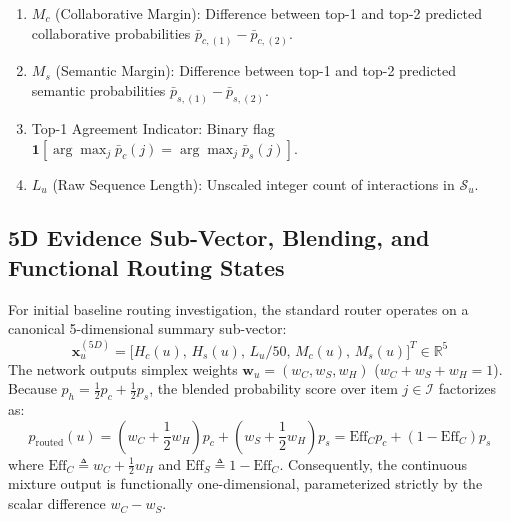 \begin{enumerate}[leftmargin=*]
    \item $M_c$ (Collaborative Margin): Difference between top-1 and top-2 predicted collaborative probabilities $\bar{p}_{c,(1)} - \bar{p}_{c,(2)}$.
    \item $M_s$ (Semantic Margin): Difference between top-1 and top-2 predicted semantic probabilities $\bar{p}_{s,(1)} - \bar{p}_{s,(2)}$.
    \item Top-1 Agreement Indicator: Binary flag $\mathbf{1}[\arg\max_j \bar{p}_c(j) = \arg\max_j \bar{p}_s(j)]$.
    \item $L_u$ (Raw Sequence Length): Unscaled integer count of interactions in $\mathcal{S}_u$.
\end{enumerate}

\subsection{5D Evidence Sub-Vector, Blending, and Functional Routing States}
\label{sec:blending}

For initial baseline routing investigation, the standard router operates on a canonical 5-dimensional summary sub-vector:
\begin{equation}
    \mathbf{x}_u^{(5D)} = \big[ H_c(u),\, H_s(u),\, L_u/50,\, M_c(u),\, M_s(u) \big]^T \in \mathbb{R}^5
\end{equation}
The network outputs simplex weights $\mathbf{w}_u = (w_C, w_S, w_H)$ ($w_C + w_S + w_H = 1$). Because $p_h = \frac{1}{2}p_c + \frac{1}{2}p_s$, the blended probability score over item $j \in \mathcal{I}$ factorizes as:
\begin{equation}
    p_{\text{routed}}(u) = \left(w_C + \frac{1}{2} w_H\right) p_c + \left(w_S + \frac{1}{2} w_H\right) p_s = \text{Eff}_C p_c + (1 - \text{Eff}_C) p_s
\end{equation}
where $\text{Eff}_C \triangleq w_C + \frac{1}{2} w_H$ and $\text{Eff}_S \triangleq 1 - \text{Eff}_C$. Consequently, the continuous mixture output is functionally one-dimensional, parameterized strictly by the scalar difference $w_C - w_S$.

